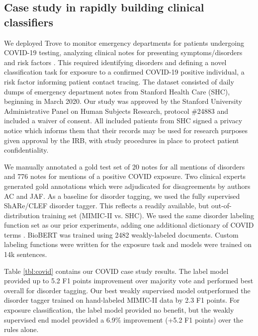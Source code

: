 \documentclass{article}
\begin{document}
\subsection*{Case study in rapidly building clinical classifiers}
We deployed Trove to monitor emergency departments for patients undergoing COVID-19 testing, analyzing clinical notes for presenting symptoms/disorders and risk factors \cite{Callahan2020-gf}. 
This required identifying disorders and defining a novel classification task for exposure to a confirmed COVID-19 positive individual, a risk factor informing patient contact tracing. 
The dataset consisted of daily dumps of emergency department notes from Stanford Health Care (SHC), beginning in March 2020. 
Our study was approved by the Stanford University Administrative Panel on Human Subjects Research, protocol \#24883
{and included a waiver of consent. All included patients from SHC signed a privacy notice which informs them that their records may be used for research purposes given approval by the IRB, with study procedures in place to protect patient confidentiality.}

We manually annotated a gold test set of 20 notes for all mentions of disorders and 776 notes for mentions of a positive COVID exposure.  
Two clinical experts generated gold annotations which were adjudicated for disagreements by authors AC and JAF. 
As a baseline for disorder tagging, we used the fully supervised ShARe/CLEF disorder tagger.
This reflects a readily available, but out-of-distribution training set (MIMIC-II \cite{saeed2011multiparameter} vs. SHC).
We used the same disorder labeling function set as our prior experiments, adding one additional dictionary of COVID terms \cite{emerse}.  
BioBERT was trained using 2482 weakly-labeled documents.
Custom labeling functions were written for the exposure task and models were trained on 14k sentences.


Table \ref{tbl:covid} contains our COVID case study results. 
The label model provided up to 5.2 F1 points improvement over majority vote and performed best overall for disorder tagging.
Our best weakly supervised model outperformed the disorder tagger trained on hand-labeled MIMIC-II data by 2.3 F1 points.
For exposure classification, the label model provided no benefit, but the weakly supervised end model provided a 6.9\% improvement (+5.2 F1 points) over the rules alone. 
\end{document}
